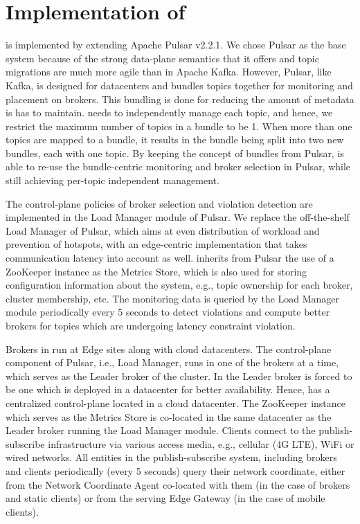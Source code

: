\section{Implementation of \epulsar{}}
\epulsar{} is implemented by extending Apache Pulsar v2.2.1. We chose Pulsar as the base system because of the strong data-plane semantics that it offers and topic migrations are much more agile than in Apache Kafka. However, Pulsar, like Kafka, is designed for datacenters and bundles topics together for monitoring and placement on brokers. This bundling is done for reducing the amount of metadata is has to maintain. \epulsar{} needs to independently manage each topic, and hence, we restrict the maximum number of topics in a bundle to be 1. When more than one topics are mapped to a bundle, it results in the bundle being split into two new bundles, each with one topic. By keeping the concept of bundles from Pulsar, \epulsar{} is able to re-use the bundle-centric monitoring and broker selection in Pulsar, while still achieving per-topic independent management.
\par The control-plane policies of broker selection and violation detection are implemented in the Load Manager module of Pulsar. We replace the off-the-shelf Load Manager of Pulsar, which aims at even distribution of workload and prevention of hotspots, with an edge-centric implementation that takes communication latency into account as well. \epulsar{} inherits from Pulsar the use of a ZooKeeper instance as the Metrics Store, which is also used for storing configuration information about the system, e.g., topic ownership for each broker, cluster membership, etc. The monitoring data is queried by the Load Manager module periodically every 5 seconds to detect violations and compute better brokers for topics which are undergoing latency constraint violation.

\par Brokers in \epulsar{} run at Edge sites along with cloud datacenters. The control-plane component of Pulsar, i.e., Load Manager, runs in one of the brokers at a time, which serves as the Leader broker of the cluster. In \epulsar{} the Leader broker is forced to be one which is deployed in a datacenter for better availability. Hence, \epulsar{} has a centralized control-plane located in a cloud datacenter. The ZooKeeper instance which serves as the Metrics Store is co-located in the same datacenter as the Leader broker running the Load Manager module. Clients connect to the publish-subscribe infrastructure via various access media, e.g., cellular (4G LTE), WiFi or wired networks. All entities in the publish-subscribe system, including brokers and clients periodically (every 5 seconds) query their network coordinate, either from the Network Coordinate Agent co-located with them (in the case of brokers and static clients) or from the serving Edge Gateway (in the case of mobile clients).

